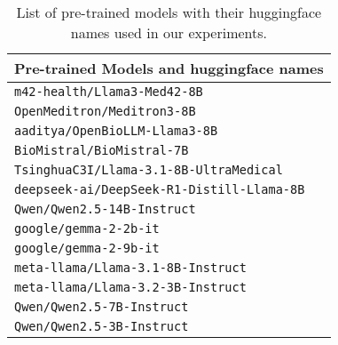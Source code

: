 \begin{table}[t!]
\centering
\begin{tabular}{l}
\hline
\textbf{Pre-trained Models and huggingface names} \\
\hline
\texttt{m42-health/Llama3-Med42-8B} \\
\texttt{OpenMeditron/Meditron3-8B} \\
\texttt{aaditya/OpenBioLLM-Llama3-8B} \\
\texttt{BioMistral/BioMistral-7B} \\
\texttt{TsinghuaC3I/Llama-3.1-8B-UltraMedical} \\
\texttt{deepseek-ai/DeepSeek-R1-Distill-Llama-8B} \\
\texttt{Qwen/Qwen2.5-14B-Instruct} \\
\texttt{google/gemma-2-2b-it} \\
\texttt{google/gemma-2-9b-it} \\
\texttt{meta-llama/Llama-3.1-8B-Instruct} \\
\texttt{meta-llama/Llama-3.2-3B-Instruct} \\
\texttt{Qwen/Qwen2.5-7B-Instruct} \\
\texttt{Qwen/Qwen2.5-3B-Instruct} \\
\hline
\end{tabular}
\caption{List of pre-trained models with their huggingface names used in our experiments.}
\label{tab:models}
\end{table}